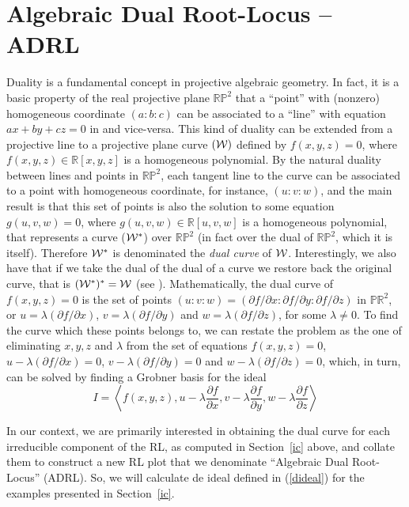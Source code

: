 \documentclass{article}
\begin{document}
\section{Algebraic Dual Root-Locus -- ADRL} \label{darl}
Duality is a fundamental concept in projective algebraic geometry. In fact, it is a basic
property of the real projective plane $\mathbb{RP}^2$ that a ``point'' with (nonzero) homogeneous
coordinate $(a:b:c)$ can be associated to a ``line'' with equation $ax+by+cz=0$ in and vice-versa.
This kind of duality can be extended from a projective line to a projective plane curve $({\cal W})$ 
defined by $f(x,y,z) = 0$, where $f(x,y,z)\in\mathbb R[x,y,z]$ is a homogeneous polynomial. 
By the natural duality between lines and points in $\mathbb{RP}^2$, 
each tangent line to the curve can 
be associated to a point with homogeneous coordinate, for instance, $(u:v:w)$, and the main result is that this 
set of points is also the solution to some equation $g(u,v,w)=0$, where $g(u,v,w)\in\mathbb R[u,v,w]$ is a
homogeneous polynomial, that represents a curve (${\cal W}^*$) over $\mathbb{RP}^2$ (in fact over the dual 
of $\mathbb{RP}^2$, which it is itself). Therefore  
${\cal W}^*$ is denominated the {\em dual curve} of ${\cal W}$. Interestingly, we also have that if we take the dual of the 
dual of a curve we restore back the original curve, that is $({\cal W}^*)^* = {\cal W}$ (see \cite{gray}). Mathematically, 
the dual curve of $f(x,y,z)=0$ is the set of points $(u:v:w)=(\partial f/\partial x:\partial f/\partial y:\partial f/\partial z)$ in 
$\mathbb{PR}^2$, or $u=\lambda(\partial f/\partial x)$, $v=\lambda(\partial f/\partial y)$ and $w=\lambda(\partial f/\partial z)$,
for some $\lambda\neq 0$. To find the curve which these points belongs to, we can restate the problem as the one of 
eliminating $x,y,z$ and $\lambda$ from the set of equations 
$f(x,y,z)=0$, $u-\lambda(\partial f/\partial x)=0$, $v-\lambda(\partial f/\partial y)=0$ and 
$w-\lambda(\partial f/\partial z)=0$, which, in turn, can be solved by finding a Grobner basis for the ideal
\begin{equation}\label{dideal}
I = \left\langle f(x,y,z), u-\lambda\frac{\partial f}{\partial x}, v-\lambda\frac{\partial f}{\partial y}, 
w-\lambda\frac{\partial f}{\partial z}\right\rangle
\end{equation}

In our context, we are primarily interested in obtaining the dual curve for each irreducible component of
the RL, as computed in Section~\ref{ic} above, and collate them to construct a new RL plot that we 
denominate ``Algebraic Dual Root-Locus'' (ADRL). So, we will calculate de ideal defined in (\ref{dideal})
for the examples presented in Section~\ref{ic}.
\end{document}

